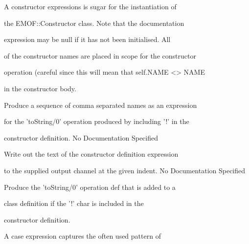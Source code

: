         A constructor expressions is sugar for the instantiation of

        the EMOF::Constructor class. Note that the documentation

        expression may be null if it has not been initialised. All

        of the constructor names are placed in scope for the constructor

        operation (careful since this will mean that self.NAME <> NAME

        in the constructor body.

	    Produce a sequence of comma separated names as an expression

	    for the 'toString/0' operation produced by including '!' in the

	    constructor definition.
No Documentation Specified

        Write out the text of the constructor definition expression

        to the supplied output channel at the given indent.
No Documentation Specified

        Produce the 'toString/0' operation def that is added to a

        class definition if the '!' char is included in the

        constructor definition.

      A case expression captures the often used pattern of

